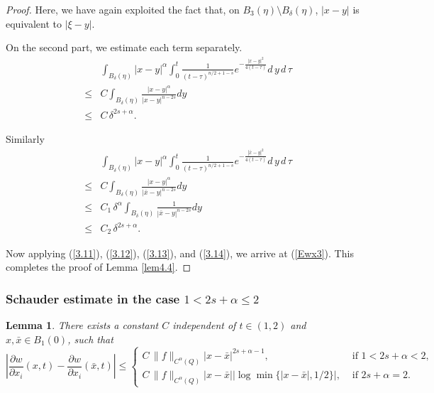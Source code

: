 \documentclass[12pt]{article}
\newtheorem{lemma}[definition]{Lemma}
\theoremstyle{remark}
\numberwithin{equation}{section}
\begin{document}
\begin{proof}
Here, we have again exploited  the fact that, on $B_3(\eta)\setminus B_\delta (\eta)$, $|x-y|$ is equivalent to $|\xi -y|$.

On the second part, we estimate each term separately.
\begin{eqnarray}
& & \int_{B_\delta (\eta)} |x-y|^\alpha \int_0^t \frac{1}{(t-\tau)^{n/2+1-s}} e^{- \frac{|x-y|^2}{4(t-\tau)}} d \, y \, d \, \tau \nonumber \\
& \leq & C \int_{B_\delta (\eta)} \frac{|x-y|^\alpha}{|x-y|^{n-2s}} d y \nonumber \\
&\leq &  C \, \delta^{2s+\alpha}.
\label{3.12}
\end{eqnarray}

Similarly
\begin{eqnarray}
& & \int_{B_\delta (\eta)} |x-y|^\alpha \int_0^t \frac{1}{(t-\tau)^{n/2+1-s}} e^{- \frac{|\bar{x}-y|^2}{4(t-\tau)}} d \, y \, d \, \tau \nonumber \\
& \leq & C \int_{B_\delta (\eta)} \frac{|x-y|^\alpha}{|\bar{x}-y|^{n-2s}} d y \nonumber \\
& \leq & C_1 \, \delta^\alpha \int_{B_\delta (\eta)} \frac{1}{|\bar{x}-y|^{n-2s}} d y \nonumber \\
&\leq &  C_2 \, \delta^{2s+\alpha}.
\label{3.13}
\end{eqnarray}

Now applying (\ref{3.11}), (\ref{3.12}), (\ref{3.13}), and (\ref{3.14}), we arrive at (\ref{Ewx3}). This completes the proof of Lemma \ref{lem4.4}. \end{proof}

\subsubsection{Schauder estimate in the case $1 < 2s + \alpha  \leq 2$}

\begin{lemma} \label{lem4.5}
There exists a constant $C$ independent of $t \in (1,2)$ and $x, \bar{x} \in B_1(0)$, such that
\begin{equation} \label{Ewx4}
\left|\frac{\partial w}{\partial x_i} (x,t) - \frac{\partial w}{\partial x_i} (\bar{x}, t)\right| \leq \left\{ \begin{array}{ll}
C \, \|f\|_{C^\alpha(Q)} |x - \bar{x}|^{2s +\alpha -1}, & \mbox{ if } 1< 2s +\alpha < 2, \\
C \, \|f\|_{C^\alpha(Q)} |x - \bar{x}|  |\log \min\{|x-\bar{x}|, 1/2\}|, & \mbox{ if } 2s +\alpha = 2.
\end{array}
\right.
\end{equation}
\end{lemma}
\end{document}
